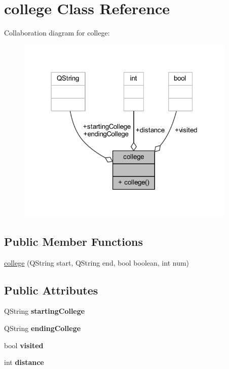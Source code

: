 \hypertarget{classcollege}{}\section{college Class Reference}
\label{classcollege}


Collaboration diagram for college\+:\nopagebreak
\begin{figure}[H]
\begin{center}
\leavevmode
\includegraphics[width=297pt]{classcollege__coll__graph}
\end{center}
\end{figure}
\subsection*{Public Member Functions}
\begin{DoxyCompactItemize}
\item 
\hyperlink{classcollege_afdcf43c3638a4312b0174c53dcb5e4aa}{college} (Q\+String start, Q\+String end, bool boolean, int num)
\end{DoxyCompactItemize}
\subsection*{Public Attributes}
\begin{DoxyCompactItemize}
\item 
\mbox{\label{classcollege_a91d5c57f0cbad290347af66575fd9df8}} 
Q\+String {\bfseries starting\+College}
\item 
\mbox{\label{classcollege_a0aab2af26a9bc9a8a47b1e0040616ed1}} 
Q\+String {\bfseries ending\+College}
\item 
\mbox{\label{classcollege_a0a46d7cad4b78170248ab1f5aa1649f0}} 
bool {\bfseries visited}
\item 
\mbox{\label{classcollege_ae45aa93405c6c6f2de08e5dc007560e5}} 
int {\bfseries distance}
\end{DoxyCompactItemize}


